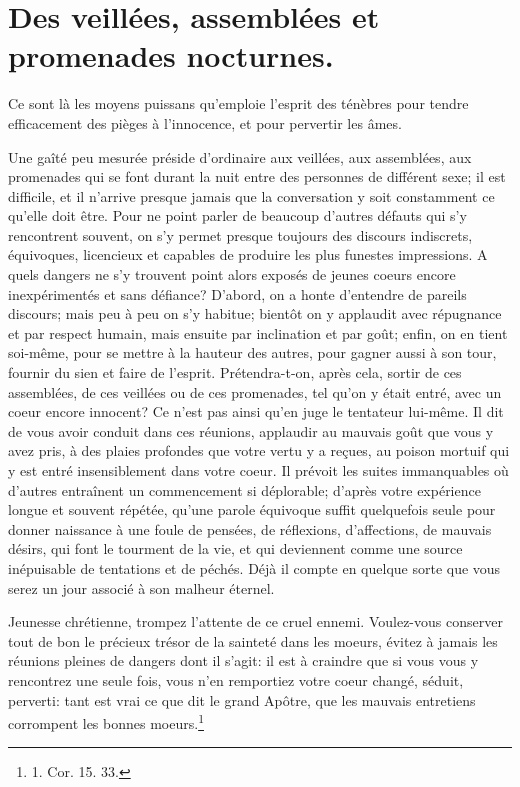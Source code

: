 \documentclass[instructions.tex]{subfiles}
\begin{document}
 
\chapter{Des veillées, assemblées et promenades nocturnes.}
 
Ce sont là les moyens puissans qu’emploie l’esprit des ténèbres pour tendre efficacement des pièges à l’innocence, et pour pervertir les âmes.

\primo Une gaîté peu mesurée préside d’ordinaire aux veillées, aux assemblées, aux promenades qui se font durant la nuit entre des personnes de différent sexe; il est difficile, et il n’arrive presque jamais que la conversation y soit constamment ce qu’elle doit être. Pour ne point parler de beaucoup d’autres défauts qui s’y rencontrent souvent, on s’y permet presque toujours des discours indiscrets, équivoques, licencieux et capables de produire les plus funestes impressions. A quels dangers ne s’y trouvent point alors exposés de jeunes coeurs encore inexpérimentés et sans défiance? D’abord, on a honte d’entendre de pareils discours; mais peu à peu on s’y habitue; bientôt on y applaudit avec répugnance et par respect humain, mais ensuite par inclination et par goût; enfin, on en tient soi-même, pour se mettre à la hauteur des autres, pour gagner aussi à son tour, fournir du sien et faire de l’esprit. Prétendra-t-on, après cela, sortir de ces assemblées, de ces veillées ou de ces promenades, tel qu’on y était entré, avec un coeur encore innocent? Ce n’est pas ainsi qu’en juge le tentateur lui-même. Il dit de vous avoir conduit dans ces réunions, applaudir au mauvais goût que vous y avez pris, à des plaies profondes que votre vertu y a reçues, au poison mortuif qui y est entré insensiblement dans votre coeur. Il prévoit les suites immanquables où d’autres entraînent un commencement si déplorable; d’après votre expérience longue et souvent répétée, qu’une parole équivoque suffit quelquefois seule pour donner naissance à une foule de pensées, de réflexions, d’affections, de mauvais désirs, qui font le tourment de la vie, et qui deviennent comme une source inépuisable de tentations et de péchés. Déjà il compte en quelque sorte que vous serez un jour associé à son malheur éternel.

Jeunesse chrétienne, trompez l’attente de ce cruel ennemi. Voulez-vous conserver tout de bon le précieux trésor de la sainteté dans les moeurs, évitez à jamais les réunions pleines de dangers dont il s’agit: il est à craindre que si vous vous y rencontrez une seule fois, vous n’en remportiez votre coeur changé, séduit, perverti: tant est vrai ce que dit le grand Apôtre, que les mauvais entretiens corrompent les bonnes moeurs.\footnote{1. Cor. 15. 33.}
\end{document}
